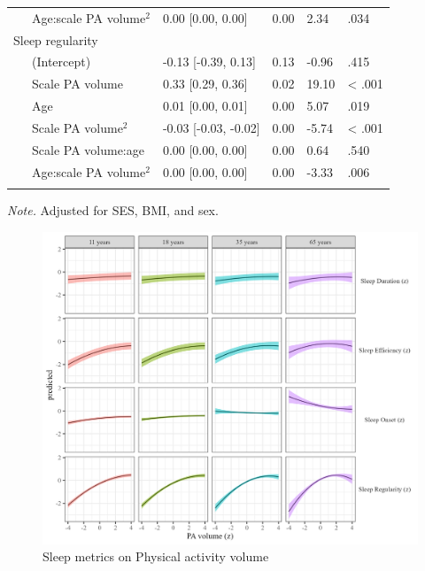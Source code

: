 \documentclass[
  man]{apa6}
\begin{document}
\begin{table}[tbp]
\begin{center}
\begin{threeparttable}
\begin{tabular}{lllll}
\ \ \ Age:scale PA volume$^2$ & 0.00 [0.00, 0.00] & 0.00 & 2.34 & .034\\
Sleep regularity &  &  &  & \\
\ \ \ (Intercept) & -0.13 [-0.39, 0.13] & 0.13 & -0.96 & .415\\
\ \ \ Scale PA volume & 0.33 [0.29, 0.36] & 0.02 & 19.10 & < .001\\
\ \ \ Age & 0.01 [0.00, 0.01] & 0.00 & 5.07 & .019\\
\ \ \ Scale PA volume$^2$ & -0.03 [-0.03, -0.02] & 0.00 & -5.74 & < .001\\
\ \ \ Scale PA volume:age & 0.00 [0.00, 0.00] & 0.00 & 0.64 & .540\\
\ \ \ Age:scale PA volume$^2$ & 0.00 [0.00, 0.00] & 0.00 & -3.33 & .006\\
\bottomrule
\addlinespace
\end{tabular}

\begin{tablenotes}[para]
\normalsize{\textit{Note.} Adjusted for SES, BMI, and sex. }
\end{tablenotes}

\end{threeparttable}
\end{center}

\end{table}

\begin{figure}
\includegraphics[width=7.08in]{../Figures/sleep on pa_volume} \caption{Sleep metrics on Physical activity volume}\label{fig:sleep-by-volume-fig}
\end{figure}
\end{document}
